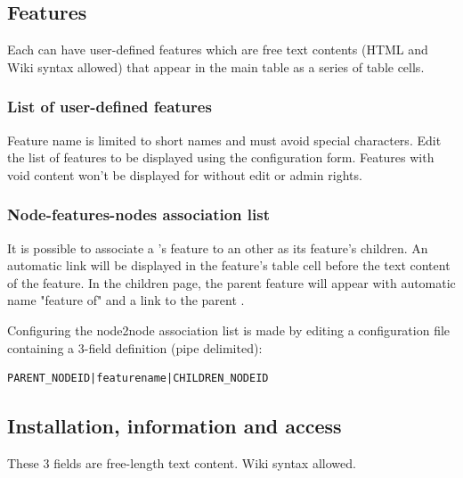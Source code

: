 \subsection{Features}

Each  can have user-defined features which are free text contents (HTML and Wiki syntax allowed) that appear in the main table as a series of table cells.

\subsubsection{List of user-defined features}

Feature name is limited to short names and must avoid special characters. Edit the list of features to be displayed using the  configuration form. Features with void content won't be displayed for  without edit or admin rights.

\subsubsection{Node-features-nodes association list}

It is possible to associate a 's feature to an other  as its feature's children. An automatic link will be displayed in the feature's table cell before the text content of the feature. In the children  page, the parent feature will appear with automatic name "feature of" and a link to the parent .

Configuring the node2node association list is made by editing a configuration file containing a 3-field definition (pipe delimited):

\begin{lstlisting}[title=\wofile{nodes2nodes.rc} (excerpt)]
PARENT_NODEID|featurename|CHILDREN_NODEID
\end{lstlisting}


\subsection{Installation, information and access}

These 3 fields are free-length text content. Wiki syntax allowed.

